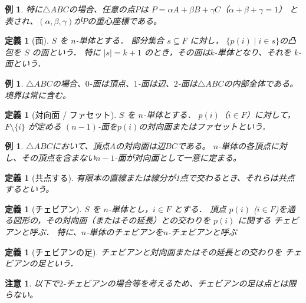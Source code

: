 \documentclass[a4paper,12pt]{bxjsbook}
\theoremstyle{theorem}
\newtheorem{definition}[theorem]{定義}
\newtheorem{example}[theorem]{例}
\newtheorem{remark}[theorem]{注意}
\begin{document}
  \begin{example}
      \indent 特に$\triangle ABC$の場合、任意の点$P$は
      $P = \alpha A + \beta B + \gamma C$（$\alpha + \beta + \gamma = 1$）
      と表され、$(\alpha, \beta, \gamma)$が$P$の重心座標である。
  \end{example}


  \begin{definition}[面]
      $S$ を $n$-単体とする．
      部分集合 $s\subseteq F$ に対し，
      $\{p(i)\mid i\in s\}$の凸包を \emph{$S$ の面}という．
      特に $|s|=k+1$ のとき，その面は$k$-単体となり、それを \emph{$k$-面}という．
  \end{definition}

  \begin{example}
      $\triangle ABC$の場合、$0$-面は頂点、$1$-面は辺、$2$-面は$\triangle ABC$の内部全体である。
      境界は常に含む。
  \end{example}
  
  \begin{definition}[対向面 / ファセット]
      $S$ を $n$-単体とする．
      $p(i)$（$i\in F$）に対して，
      $F\setminus\{i\}$ が定める $(n-1)$-面を\emph{$p(i)$の対向面またはファセット}という．
  \end{definition}    
  
  \begin{example}
      $\triangle ABC$において、頂点$A$の対向面は辺$BC$である。
      $n$-単体の各頂点に対し、その頂点を含まない$n-1$-面が対向面として一意に定まる。
  \end{example}

  \begin{definition}[共点する]
      有限本の直線または線分が1点で交わるとき、それらは\emph{共点する}という。
  \end{definition}
  
  \begin{definition}[チェビアン]
      $S$ を $n$-単体とし，$i\in F$ とする．
      頂点 $p(i)$ ($i\in F$)を通る図形の，その対向面（またはその延長）との交わりを
      $p(i)$ に関する \emph{チェビアン}と呼ぶ．
      特に、$n$-単体のチェビアンを\emph{$n$-チェビアン}と呼ぶ
  \end{definition}    
  
  \begin{definition}[チェビアンの足]
      チェビアンと対向面またはその延長との交わりを \emph{チェビアンの足}という．
  \end{definition}

  \begin{remark}
      以下で$2$-チェビアンの場合等を考えるため、チェビアンの足は点とは限らない。
  \end{remark}
\end{document}
